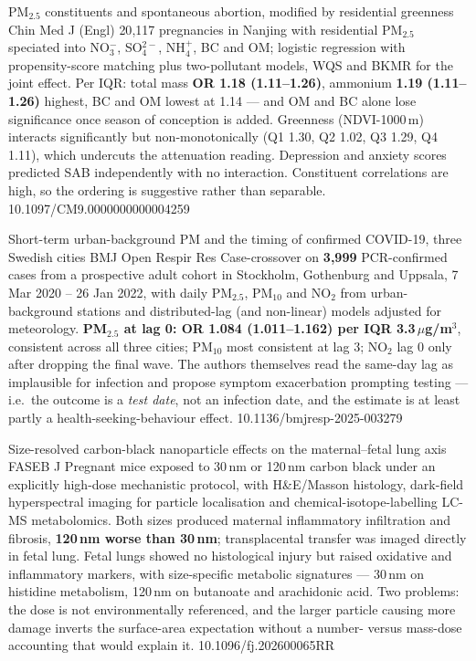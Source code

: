 \documentclass[10pt]{article}
\begin{document}

{PM$_{2.5}$ constituents and spontaneous abortion, modified by residential greenness}
{Chin Med J (Engl)}
{20{,}117 pregnancies in Nanjing with residential PM$_{2.5}$ speciated into NO$_3^-$,
SO$_4^{2-}$, NH$_4^+$, BC and OM; logistic regression with propensity-score matching plus
two-pollutant models, WQS and BKMR for the joint effect. Per IQR: total mass
\textbf{OR 1.18 (1.11--1.26)}, ammonium \textbf{1.19 (1.11--1.26)} highest,
BC and OM lowest at 1.14 --- and OM and BC alone lose significance once season of conception
is added. Greenness (NDVI-1000\,m) interacts significantly but non-monotonically
(Q1 1.30, Q2 1.02, Q3 1.29, Q4 1.11), which undercuts the attenuation reading. Depression
and anxiety scores predicted SAB independently with no interaction. Constituent
correlations are high, so the ordering is suggestive rather than separable.}
{10.1097/CM9.0000000000004259}


{Short-term urban-background PM and the timing of confirmed COVID-19, three Swedish cities}
{BMJ Open Respir Res}
{Case-crossover on \textbf{3{,}999} PCR-confirmed cases from a prospective adult cohort in
Stockholm, Gothenburg and Uppsala, 7 Mar 2020 -- 26 Jan 2022, with daily PM$_{2.5}$,
PM$_{10}$ and NO$_2$ from urban-background stations and distributed-lag (and non-linear)
models adjusted for meteorology. \textbf{PM$_{2.5}$ at lag 0: OR 1.084
(1.011--1.162) per IQR 3.3\,$\mu$g/m$^3$}, consistent across all three cities; PM$_{10}$
most consistent at lag 3; NO$_2$ lag 0 only after dropping the final wave. The authors
themselves read the same-day lag as implausible for infection and propose symptom
exacerbation prompting testing --- i.e.\ the outcome is a \emph{test date}, not an infection
date, and the estimate is at least partly a health-seeking-behaviour effect.}
{10.1136/bmjresp-2025-003279}


{Size-resolved carbon-black nanoparticle effects on the maternal--fetal lung axis}
{FASEB J}
{Pregnant mice exposed to 30\,nm or 120\,nm carbon black under an explicitly high-dose
mechanistic protocol, with H\&E/Masson histology, dark-field hyperspectral imaging for
particle localisation and chemical-isotope-labelling LC-MS metabolomics. Both sizes produced
maternal inflammatory infiltration and fibrosis, \textbf{120\,nm worse than 30\,nm};
transplacental transfer was imaged directly in fetal lung. Fetal lungs showed no histological
injury but raised oxidative and inflammatory markers, with size-specific metabolic
signatures --- 30\,nm on histidine metabolism, 120\,nm on butanoate and arachidonic acid.
Two problems: the dose is not environmentally referenced, and the larger particle causing
more damage inverts the surface-area expectation without a number- versus mass-dose
accounting that would explain it.}
{10.1096/fj.202600065RR}
\end{document}
